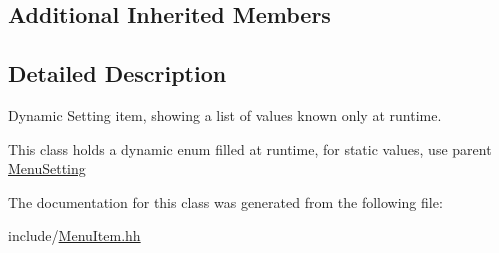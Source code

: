 \subsection*{Additional Inherited Members}


\subsection{Detailed Description}
Dynamic Setting item, showing a list of values known only at runtime. 

This class holds a dynamic enum filled at runtime, for static values, use parent \hyperlink{classMenuSetting}{Menu\+Setting} 

The documentation for this class was generated from the following file\+:\begin{DoxyCompactItemize}
\item 
include/\hyperlink{MenuItem_8hh}{Menu\+Item.\+hh}\end{DoxyCompactItemize}
